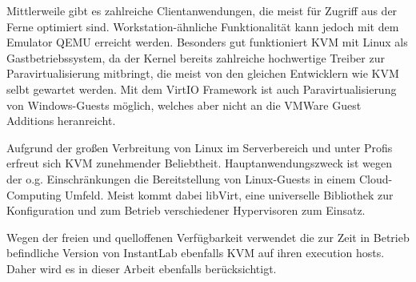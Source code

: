		Mittlerweile gibt es zahlreiche Clientanwendungen, die meist für Zugriff aus der Ferne optimiert sind. 
		Workstation-ähnliche Funktionalität kann jedoch mit dem Emulator QEMU erreicht werden.
		Besonders gut funktioniert KVM mit Linux als Gastbetriebssystem, da der Kernel bereits zahlreiche hochwertige Treiber zur Paravirtualisierung mitbringt, die meist von den gleichen Entwicklern wie KVM selbt gewartet werden.
		Mit dem VirtIO Framework ist auch Paravirtualisierung von Windows-Guests möglich, welches aber nicht an die VMWare Guest Additions heranreicht.

		Aufgrund der großen Verbreitung von Linux im Serverbereich und unter Profis erfreut sich KVM zunehmender Beliebtheit.
		Hauptanwendungszweck ist wegen der o.g. Einschränkungen die Bereitstellung von Linux-Guests in einem Cloud-Computing Umfeld.
		Meist kommt dabei libVirt, eine universelle Bibliothek zur Konfiguration und zum Betrieb verschiedener Hypervisoren zum Einsatz. 
		
		Wegen der freien und quelloffenen Verfügbarkeit verwendet die zur Zeit in Betrieb befindliche Version von InstantLab ebenfalls KVM auf ihren execution hosts. 
		Daher wird es in dieser Arbeit ebenfalls berücksichtigt.
